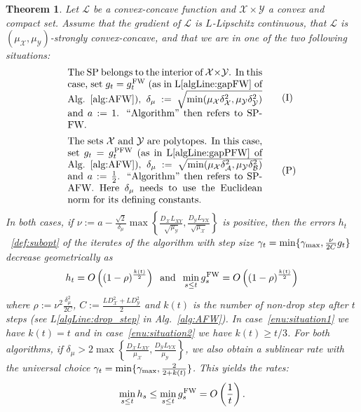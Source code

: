 \documentclass[twoside]{article}
\makeatletter
\renewcommand{\L}{\mathcal{L}}
\newcommand{\X}{\mathcal{X}}
\newcommand{\Y}{\mathcal{Y}}
\newcommand{\M}{\X \times \Y}
\newcommand{\gap}{g_{t}}
\newcommand{\CondNumb}{\nu}
\newcommand{\leqnomode}{\tagsleft@true\let\veqno\@@leqno}
\newcommand{\reqnomode}{\tagsleft@false\let\veqno\@@eqno}
\newtheorem{theorem}[definition]{Theorem}
\newcommand{\stepsize}{\gamma}
\newcommand{\stepmax}{\stepsize_{\textnormal{\scriptsize max}}} %
\newcommand{\FW}{{\hspace{0.05em}\textnormal{FW}}}
\newcommand{\PW}{{\hspace{0.05em}\textnormal{PFW}}}
\newcommand{\0}{\mathbf{0}} %
\makeatother
\begin{document}
\begin{theorem}\label{thm:conv}
  Let $\L$ be a convex-concave function and $\M$ a convex and compact set. 
  Assume that the gradient of  $\L$ is $L$-Lipschitz continuous, that $\L$ is $(\mu_\X,\mu_\Y)$-strongly convex-concave, and that we are in one of the two following situations:
  \leqnomode %
  \begin{align*}
  &\parbox{7cm}{The SP belongs to the interior of $\M$. In this case, set $\gap = \gap^{\FW}$ (as in L\ref{algLine:gapFW} of Alg.~\ref{alg:AFW}), $\delta_\mu:= \sqrt{\min(\mu_\X\delta_\X^2,\mu_\Y\delta_\Y^2)}$ and $a :=  1 $. ``Algorithm'' then refers to SP-FW.
    }
    \label{enu:situation1} 
    \tag{I}
      \\[2mm]
    &\parbox{7cm}{The sets $\X$ and $\Y$ are polytopes. In this case, set $\gap = \gap^{\PW}$ (as in L\ref{algLine:gapPFW} of Alg.~\ref{alg:AFW}), $\delta_\mu := \sqrt{\min(\mu_\X \delta_{\mathcal A}^2, \mu_\Y \delta_{\mathcal B}^2)}$ and $a:=  \frac{1}{2}$. ``Algorithm'' then refers to SP-AFW. Here $\delta_\mu$ needs to use the Euclidean norm for its defining constants.
    }
    \label{enu:situation2} 
    \tag{P}
  \end{align*}
  \reqnomode
  In both cases, if $\CondNumb:= a -  \tfrac{\sqrt{2}}{\delta_\mu}\max\left\{ \tfrac{D_\X L_{XY}}{\sqrt{\mu_\Y}}, \tfrac{D_\Y L_{YX}}{\sqrt{\mu_\X}}\right\}$ is positive, then the errors $h_t$~\eqref{def:subopt} of the iterates of the algorithm with step size
  $\gamma_t = \min\{\stepmax, \frac\CondNumb{2C}\gap\}$ decrease
  geometrically as 
  \begin{equation*} 
    h_t = O \left( (1- \rho)^{\frac{k(t)}{2}} \right) \: \text{ and }
 \: \min_{s\leq t} g_s^\FW = O \left( (1- \rho)^{\frac{k(t)}{2}} \right)
  \end{equation*} 
  where
  $\rho := \CondNumb^2\frac{\delta_\mu^2}{2C}$, $C := \tfrac{L D_\X^2+ L D_\Y^2}{2}$ and $k(t)$ is the number of non-drop step after $t$ steps (see L\ref{algLine:drop_step} in Alg.~\ref{alg:AFW}). In case~\eqref{enu:situation1} we have $k(t)=t$ and in case~\eqref{enu:situation2} we have $k(t)\geq t/3$.
  For both algorithms, if $\delta_\mu >2\max\left\{ \tfrac{D_\X L_{XY}}{\mu_\X}, \tfrac{D_\Y L_{YX}}{\mu_\Y}\right\}$, we also obtain a sublinear rate with the universal choice $\gamma_t =\min\{\stepmax, \frac{2}{2+k(t)} \}$. This yields the rates:
  \vspace{-3mm}
  \begin{equation}
         \min_{s\leq t} h_s \leq  \min_{s\leq t} g_s^\FW = O\left( \frac{1}{t} \right).
    \end{equation}
\end{theorem}
\end{document}

